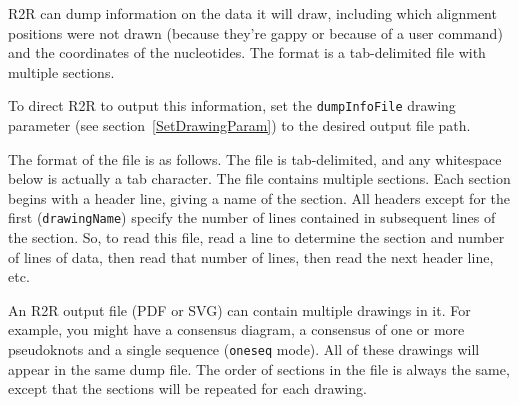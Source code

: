 \documentclass[letterpaper,12pt]{report}
\begin{document}
R2R can dump information on the data it will draw, including which alignment positions were not drawn (because they're gappy or because of a user command) and the coordinates of the nucleotides.  The format is a tab-delimited file with multiple sections.

To direct R2R to output this information, set the {\tt dumpInfoFile} drawing parameter (see section~\ref{SetDrawingParam}) to the desired output file path.

The format of the file is as follows.  The file is tab-delimited, and any whitespace below is actually a tab character.  The file contains multiple sections.  Each section begins with a header line, giving a name of the section.  All headers except for the first ({\tt drawingName}) specify the number of lines contained in subsequent lines of the section.  So, to read this file, read a line to determine the section and number of lines of data, then read that number of lines, then read the next header line, etc.

An R2R output file (PDF or SVG) can contain multiple drawings in it.  For example, you might have a consensus diagram, a consensus of one or more pseudoknots and a single sequence ({\tt oneseq} mode).  All of these drawings will appear in the same dump file.  The order of sections in the file is always the same, except that the sections will be repeated for each drawing.
\end{document}
